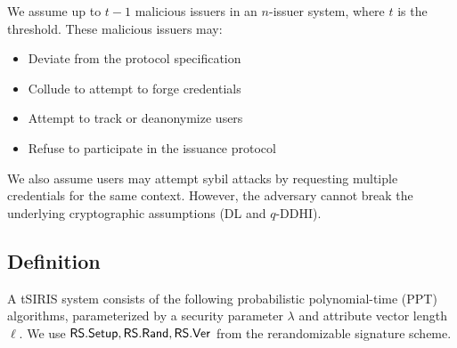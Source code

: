 We assume up to $t-1$ malicious issuers in an $n$-issuer system, where $t$ is the threshold. These malicious issuers may:
\begin{itemize}
    \item Deviate from the protocol specification
    \item Collude to attempt to forge credentials
    \item Attempt to track or deanonymize users
    \item Refuse to participate in the issuance protocol
\end{itemize}

We also assume users may attempt sybil attacks by requesting multiple credentials for the same context. However, the adversary cannot break the underlying cryptographic assumptions (DL and $q$-DDHI).



\subsection{Definition}

A tSIRIS system consists of the following probabilistic polynomial-time (PPT) algorithms, parameterized by a security parameter $\lambda$ and attribute vector length $\ell$. We use $\mathsf{RS.Setup}, \mathsf{RS.Rand}, \mathsf{RS.Ver}$ from the rerandomizable signature scheme.

